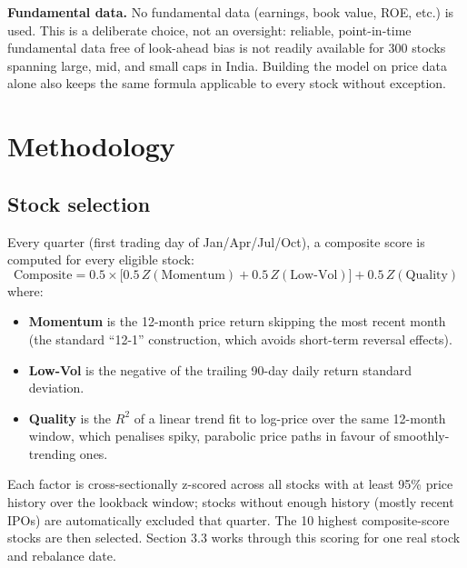 \documentclass[11pt]{article}
\begin{document}
\textbf{Fundamental data.} No fundamental data (earnings, book value, ROE, etc.) is used. This is a deliberate choice, not an oversight: reliable, point-in-time fundamental data free of look-ahead bias is not readily available for 300 stocks spanning large, mid, and small caps in India. Building the model on price data alone also keeps the same formula applicable to every stock without exception.

\section{Methodology}

\subsection{Stock selection}
Every quarter (first trading day of Jan/Apr/Jul/Oct), a composite score is computed for every eligible stock:
\[
\text{Composite} = 0.5\times\big[0.5\,Z(\text{Momentum}) + 0.5\,Z(\text{Low-Vol})\big] + 0.5\,Z(\text{Quality})
\]
where:
\begin{itemize}[leftmargin=1.2em, itemsep=1pt, topsep=0.2em]
\item \textbf{Momentum} is the 12-month price return skipping the most recent month (the standard ``12-1'' construction, which avoids short-term reversal effects).
\item \textbf{Low-Vol} is the negative of the trailing 90-day daily return standard deviation.
\item \textbf{Quality} is the $R^2$ of a linear trend fit to log-price over the same 12-month window, which penalises spiky, parabolic price paths in favour of smoothly-trending ones.
\end{itemize}
Each factor is cross-sectionally z-scored across all stocks with at least 95\% price history over the lookback window; stocks without enough history (mostly recent IPOs) are automatically excluded that quarter. The 10 highest composite-score stocks are then selected. Section 3.3 works through this scoring for one real stock and rebalance date.
\end{document}
